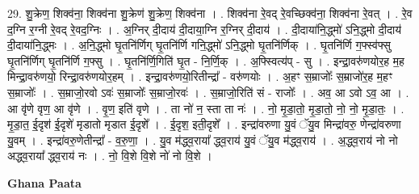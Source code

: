 \documentclass[17pt]{extarticle}
\begin{document}
29. शु॒क्रेण॒ शिक्व॑ना॒ शिक्व॑ना शु॒क्रेण॑ शु॒क्रेण॒ शिक्व॑ना । . शिक्व॑ना रे॒वद् रे॒वच्छिक्व॑ना॒ शिक्व॑ना रे॒वत् । . रे॒व द॒ग्नि र॒ग्नी रे॒वद् रे॒वद॒ग्निः । . अ॒ग्निर् दी॒दाय॑ दी॒दाया॒ग्नि र॒ग्निर् दी॒दाय॑ । . दी॒दाया॑नि॒द्ध्मो॑ ऽनि॒द्ध्मो दी॒दाय॑ दी॒दाया॑नि॒द्ध्मः । . अ॒नि॒द्ध्मो घृ॒तनि॑र्णिग् घृ॒तनि॑र्णि गनि॒द्ध्मो॑ ऽनि॒द्ध्मो घृ॒तनि॑र्णिक् । . घृ॒तनि॑र्णि ग॒फ्स्व॑फ्सु घृ॒तनि॑र्णिग् घृ॒तनि॑र्णि ग॒फ्सु । . घृ॒तनि॑र्णि॒गिति॑ घृ॒त - नि॒र्णि॒क् । . अ॒फ्स्वित्य॑प् - सु । . इन्द्रा॒वरु॑णयोर॒ह म॒ह मिन्द्रा॒वरु॑णयो॒ रिन्द्रा॒वरु॑णयोर॒हम् । . इन्द्रा॒वरु॑णयो॒रितीन्द्रा᳚ - वरु॑णयोः । . अ॒हꣳ स॒म्राजोः᳚ स॒म्राजो॑र॒ह म॒हꣳ स॒म्राजोः᳚ । . स॒म्राजो॒रवो ऽवः॑ स॒म्राजोः᳚ स॒म्राजो॒रवः॑ । . स॒म्राजो॒रिति॑ सं - राजोः᳚ । . अव॒ आ ऽवो ऽव॒ आ । . आ वृ॑णे वृण॒ आ वृ॑णे । . वृ॒ण॒ इति॑ वृणे । . ता नो॑ न॒ स्ता ता नः॑ । . नो॒ मृ॒डा॒तो॒ मृ॒डा॒तो॒ नो॒ नो॒ मृ॒डा॒तः॒ । . मृ॒डा॒त॒ ई॒दृश॑ ई॒दृशे॑ मृडातो मृडात ई॒दृशे᳚ । . ई॒दृश॒ इती॒दृशे᳚ । . इन्द्रा॑वरुणा यु॒वं ॅयु॒व मिन्द्रा॑वरु॒ णेन्द्रा॑वरुणा यु॒वम् । . इन्द्रा॑वरु॒णेतीन्द्रा᳚ - व॒रु॒णा॒ । . यु॒व म॑द्ध्व॒राया᳚ द्ध्व॒राय॑ यु॒वं ॅयु॒व म॑द्ध्व॒राय॑ । . अ॒द्ध्व॒राय॑ नो नो अद्ध्व॒राया᳚ द्ध्व॒राय॑ नः । . नो॒ वि॒शे वि॒शे नो॑ नो वि॒शे । \newline

\textbf{Ghana Paata } \newline
\end{document}
